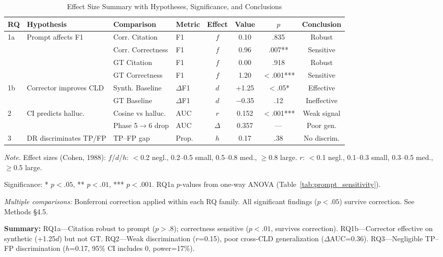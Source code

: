 \documentclass{article}
\begin{document}
\begin{table}[H]
\centering
\caption{Effect Size Summary with Hypotheses, Significance, and Conclusions}
\label{tab:effect_sizes}
\begin{threeparttable}
\scriptsize
\begin{tabular}{llllcccc}
\toprule
\textbf{RQ} & \textbf{Hypothesis} & \textbf{Comparison} & \textbf{Metric} & \textbf{Effect} & \textbf{Value} & \textbf{$p$} & \textbf{Conclusion} \\
\midrule
1a & Prompt affects F1 & Corr. Citation & F1 & $f$ & 0.10 & .835 & Robust \\
   &                   & Corr. Correctness & F1 & $f$ & 0.96 & .007** & Sensitive \\
   &                   & GT Citation & F1 & $f$ & 0.00 & .918 & Robust \\
   &                   & GT Correctness & F1 & $f$ & 1.20 & $<$.001*** & Sensitive \\
\midrule
1b & Corrector improves CLD & Synth. Baseline & $\Delta$F1 & $d$ & +1.25 & $<$.05* & Effective \\
   &                        & GT Baseline & $\Delta$F1 & $d$ & $-$0.35 & .12 & Ineffective \\
\midrule
2 & CI predicts halluc. & Cosine vs halluc. & AUC & $r$ & 0.152 & $<$.001*** & Weak signal \\
  &                     & Phase 5$\to$6 drop & AUC & $\Delta$ & 0.357 & — & Poor gen. \\
\midrule
3 & DR discriminates TP/FP & TP--FP gap & Prop. & $h$ & 0.17 & .38 & No discrim. \\
\bottomrule
\end{tabular}
\begin{tablenotes}
\scriptsize
\item \textit{Note.} Effect sizes (Cohen, 1988): $f$/$d$/$h$: $<$0.2 negl., 0.2--0.5 small, 0.5--0.8 med., $\geq$0.8 large. $r$: $<$0.1 negl., 0.1--0.3 small, 0.3--0.5 med., $\geq$0.5 large.
\item Significance: * $p<.05$, ** $p<.01$, *** $p<.001$. RQ1a $p$-values from one-way ANOVA (Table~\ref{tab:prompt_sensitivity}).
\item \textit{Multiple comparisons:} Bonferroni correction applied within each RQ family. All significant findings ($p<.05$) survive correction. See Methods \S4.5.
\item \textbf{Summary:} RQ1a---Citation robust to prompt ($p>.8$); correctness sensitive ($p<.01$, survives correction). RQ1b---Corrector effective on synthetic (+1.25$d$) but not GT. RQ2---Weak discrimination ($r$=0.15), poor cross-CLD generalization ($\Delta$AUC=0.36). RQ3---Negligible TP--FP discrimination ($h$=0.17, 95\% CI includes 0, power=17\%).
\end{tablenotes}
\end{threeparttable}
\end{table}
\end{document}
